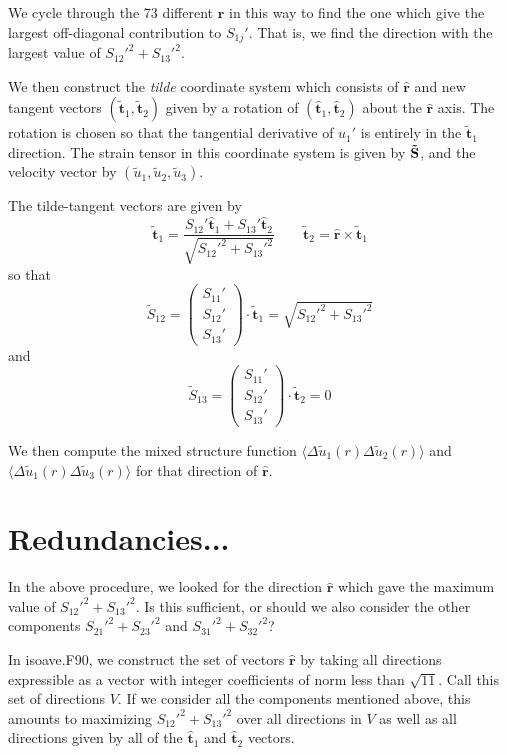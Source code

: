 \documentclass[12pt]{article}
\begin{document}
We cycle through the 73 different $\bm{{\hat r}}$ in this way to find the one 
which give the largest off-diagonal
contribution to $S_{1j}'$.  That is, we find the 
direction with the largest value of $S_{12}'^2 + S_{13}'^2$.  

We then construct the {\em tilde} coordinate system which consists
of $\bm{{\hat r}}$ and new tangent vectors $( \bm{{\tilde t}}_1, 
\bm{{\tilde t}}_2 )$ given by a rotation of $( \bm{{\hat t}}_1, \bm{{\hat t}}_2 )$
about the $\bm{{\hat r}}$ axis.  The rotation is chosen so that the 
tangential derivative of $u_1'$ is entirely in the $\bm{{\tilde t}}_1$
direction.  The strain tensor in this coordinate system
is given by ${\bf \tilde S}$, and the velocity vector by 
$( \tilde u_1, \tilde u_2, \tilde u_3)$. 

The tilde-tangent vectors are given by 
\[
\bm{{\tilde t}}_1 = \frac{S_{12}'  \bm{{\hat t}}_1 +  S_{13}'  \bm{{\hat t}}_2 }
                         {\sqrt{ S_{12}'^2 +  S_{13}'^2 } } 
\qquad
\bm{{\tilde t}}_2 = \bm{{\hat r}} \times \bm{{\tilde t}}_1
\]
so that
\[
\tilde S_{12} = 
\begin{pmatrix}  S_{11}' \\
                 S_{12}' \\
                 S_{13}' 
\end{pmatrix}
\cdot \bm{{\tilde t}}_1 = 
 \sqrt{ S_{12}'^2 + S_{13}'^2 }
\]
and 
\[
\tilde S_{13} = 
\begin{pmatrix}  S_{11}' \\
                 S_{12}' \\
                 S_{13}' 
\end{pmatrix}
\cdot \bm{{\tilde t}}_2 =  0
\]


We then compute the mixed structure function $\langle \Delta \tilde u_1 (r) 
\Delta \tilde u_2 (r)\rangle$ and 
$\langle \Delta \tilde u_1 (r) \Delta \tilde u_3 (r)\rangle$ for that direction of $\bm{{\hat r}}$.

\section*{Redundancies...}

In the above procedure, we looked for the direction $ \bm{{\hat r}}$
which gave the maximum value of $S_{12}'^2 + S_{13}'^2$.  
Is this sufficient, or should we also consider the other
components $S_{21}'^2 + S_{23}'^2$ and 
$S_{31}'^2 + S_{32}'^2$?  

In isoave.F90, we construct the set of vectors $\bm{{\hat r}}$ 
by taking all directions expressible as a vector with integer
coefficients of norm less than $\sqrt{11}$. Call this set
of directions $V$.   If we consider all the components mentioned
above, this amounts to maximizing $S_{12}'^2 + S_{13}'^2$ over
all directions in $V$ as well as all directions given by
all of the $\bm{{\hat t}}_1$ and $\bm{{\hat t}}_2$ vectors.
\end{document}
